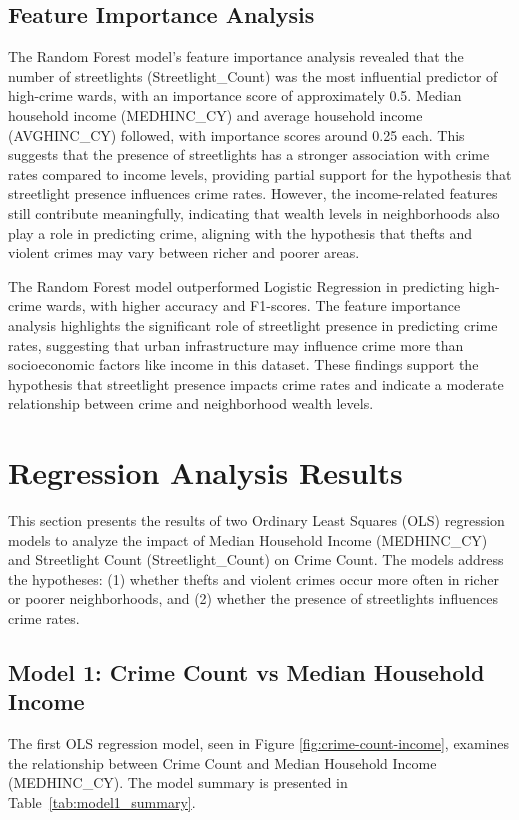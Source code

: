 \documentclass{report}
\begin{document}
\subsection{Feature Importance Analysis}
The Random Forest model's feature importance analysis revealed that the number of streetlights (Streetlight\_Count) was the most influential predictor of high-crime wards, with an importance score of approximately 0.5. Median household income (MEDHINC\_CY) and average household income (AVGHINC\_CY) followed, with importance scores around 0.25 each. This suggests that the presence of streetlights has a stronger association with crime rates compared to income levels, providing partial support for the hypothesis that streetlight presence influences crime rates. However, the income-related features still contribute meaningfully, indicating that wealth levels in neighborhoods also play a role in predicting crime, aligning with the hypothesis that thefts and violent crimes may vary between richer and poorer areas.
\par The Random Forest model outperformed Logistic Regression in predicting high-crime wards, with higher accuracy and F1-scores. The feature importance analysis highlights the significant role of streetlight presence in predicting crime rates, suggesting that urban infrastructure may influence crime more than socioeconomic factors like income in this dataset. These findings support the hypothesis that streetlight presence impacts crime rates and indicate a moderate relationship between crime and neighborhood wealth levels.

\section{Regression Analysis Results}

\par This section presents the results of two Ordinary Least Squares (OLS) regression models to analyze the impact of Median Household Income (MEDHINC\_CY) and Streetlight Count (Streetlight\_Count) on Crime Count. The models address the hypotheses: (1) whether thefts and violent crimes occur more often in richer or poorer neighborhoods, and (2) whether the presence of streetlights influences crime rates.

\subsection{Model 1: Crime Count vs Median Household Income}
\par The first OLS regression model, seen in Figure \ref{fig:crime-count-income}, examines the relationship between Crime Count and Median Household Income (MEDHINC\_CY). The model summary is presented in Table~\ref{tab:model1_summary}.
\end{document}
